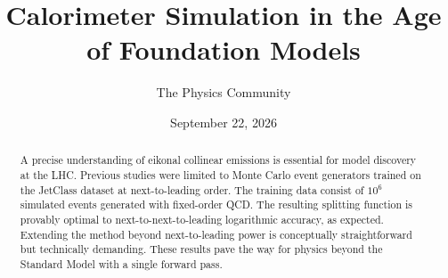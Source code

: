 \documentclass[11pt]{article}
\title{Calorimeter Simulation in the Age of Foundation Models}
\author{The Physics Community}
\date{September 22, 2026}
\numberwithin{equation}{section}
\theoremstyle{definition}
\theoremstyle{remark}
\begin{document}
\maketitle
\begin{abstract}
A precise understanding of eikonal collinear emissions is essential for
model discovery at the LHC. Previous studies were limited to Monte Carlo
event generators trained on the JetClass dataset at next-to-leading
order. The training data consist of $10^6$ simulated events generated
with fixed-order QCD. The resulting splitting function is provably
optimal to next-to-next-to-leading logarithmic accuracy, as expected.
Extending the method beyond next-to-leading power is conceptually
straightforward but technically demanding. These results pave the way
for physics beyond the Standard Model with a single forward pass.
\end{abstract}
\tableofcontents



\nocite{*}


\end{document}
